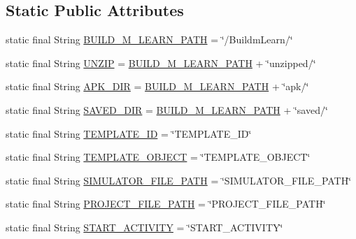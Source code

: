 \subsection*{Static Public Attributes}
\begin{DoxyCompactItemize}
\item 
static final String \hyperlink{classorg_1_1buildmlearn_1_1toolkit_1_1constant_1_1Constants_a9965876f735c5e8a6b5b1b187878da87}{B\-U\-I\-L\-D\-\_\-\-M\-\_\-\-L\-E\-A\-R\-N\-\_\-\-P\-A\-T\-H} = \char`\"{}/Buildm\-Learn/\char`\"{}
\item 
static final String \hyperlink{classorg_1_1buildmlearn_1_1toolkit_1_1constant_1_1Constants_aa7187aa1863aeed8b73d71e3d203fe3c}{U\-N\-Z\-I\-P} = \hyperlink{classorg_1_1buildmlearn_1_1toolkit_1_1constant_1_1Constants_a9965876f735c5e8a6b5b1b187878da87}{B\-U\-I\-L\-D\-\_\-\-M\-\_\-\-L\-E\-A\-R\-N\-\_\-\-P\-A\-T\-H} + \char`\"{}unzipped/\char`\"{}
\item 
static final String \hyperlink{classorg_1_1buildmlearn_1_1toolkit_1_1constant_1_1Constants_ad32e350b2a3bc331971d274727ce69c5}{A\-P\-K\-\_\-\-D\-I\-R} = \hyperlink{classorg_1_1buildmlearn_1_1toolkit_1_1constant_1_1Constants_a9965876f735c5e8a6b5b1b187878da87}{B\-U\-I\-L\-D\-\_\-\-M\-\_\-\-L\-E\-A\-R\-N\-\_\-\-P\-A\-T\-H} + \char`\"{}apk/\char`\"{}
\item 
static final String \hyperlink{classorg_1_1buildmlearn_1_1toolkit_1_1constant_1_1Constants_a657c90b7a9ba3bfd833cead98e2d9841}{S\-A\-V\-E\-D\-\_\-\-D\-I\-R} = \hyperlink{classorg_1_1buildmlearn_1_1toolkit_1_1constant_1_1Constants_a9965876f735c5e8a6b5b1b187878da87}{B\-U\-I\-L\-D\-\_\-\-M\-\_\-\-L\-E\-A\-R\-N\-\_\-\-P\-A\-T\-H} + \char`\"{}saved/\char`\"{}
\item 
static final String \hyperlink{classorg_1_1buildmlearn_1_1toolkit_1_1constant_1_1Constants_a2ee9d59d6a353dc4664ed2e2086dae9d}{T\-E\-M\-P\-L\-A\-T\-E\-\_\-\-I\-D} = \char`\"{}T\-E\-M\-P\-L\-A\-T\-E\-\_\-\-I\-D\char`\"{}
\item 
static final String \hyperlink{classorg_1_1buildmlearn_1_1toolkit_1_1constant_1_1Constants_a9e2658a69f3f70584955bbdc947ca0bc}{T\-E\-M\-P\-L\-A\-T\-E\-\_\-\-O\-B\-J\-E\-C\-T} = \char`\"{}T\-E\-M\-P\-L\-A\-T\-E\-\_\-\-O\-B\-J\-E\-C\-T\char`\"{}
\item 
static final String \hyperlink{classorg_1_1buildmlearn_1_1toolkit_1_1constant_1_1Constants_a5e8ea6ec23e727cbfc84e5b854ae311c}{S\-I\-M\-U\-L\-A\-T\-O\-R\-\_\-\-F\-I\-L\-E\-\_\-\-P\-A\-T\-H} = \char`\"{}S\-I\-M\-U\-L\-A\-T\-O\-R\-\_\-\-F\-I\-L\-E\-\_\-\-P\-A\-T\-H\char`\"{}
\item 
static final String \hyperlink{classorg_1_1buildmlearn_1_1toolkit_1_1constant_1_1Constants_ab2586e8aa144cd7e8b4928186d709ea8}{P\-R\-O\-J\-E\-C\-T\-\_\-\-F\-I\-L\-E\-\_\-\-P\-A\-T\-H} = \char`\"{}P\-R\-O\-J\-E\-C\-T\-\_\-\-F\-I\-L\-E\-\_\-\-P\-A\-T\-H\char`\"{}
\item 
static final String \hyperlink{classorg_1_1buildmlearn_1_1toolkit_1_1constant_1_1Constants_a2799e097282009a747db0225f72508ff}{S\-T\-A\-R\-T\-\_\-\-A\-C\-T\-I\-V\-I\-T\-Y} = \char`\"{}S\-T\-A\-R\-T\-\_\-\-A\-C\-T\-I\-V\-I\-T\-Y\char`\"{}
\end{DoxyCompactItemize}



